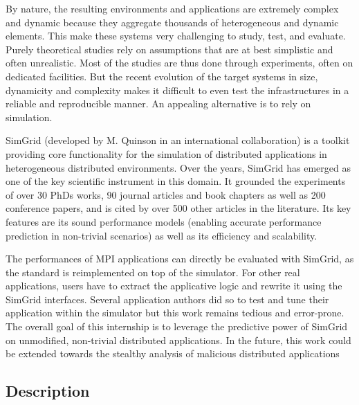 \documentclass[a4paper,11pt]{article}
\begin{document}
By nature, the resulting environments and applications are extremely
complex and dynamic because they aggregate thousands of heterogeneous
and dynamic elements. This make these systems very challenging to
study, test, and evaluate.  Purely theoretical studies rely on
assumptions that are at best simplistic and often unrealistic. Most of
the studies are thus done through experiments, often on dedicated
facilities.
%
But the recent evolution of the target systems in size, dynamicity and
complexity makes it difficult to even test the infrastructures in a
reliable and reproducible manner. An appealing alternative is to rely
on simulation.


SimGrid (developed by M. Quinson in an international collaboration) is
a toolkit providing core functionality for the simulation of
distributed applications in heterogeneous distributed environments.
Over the years, SimGrid has emerged as one of the key scientific
instrument in this domain. It grounded the experiments of over 30 PhDs
works, 90 journal articles and book chapters as well as 200 conference
papers, and is cited by over 500 other articles in the literature. Its
key features are its sound performance models (enabling accurate
performance prediction in non-trivial scenarios) as well as its
efficiency and scalability.

The performances of MPI applications can directly be evaluated with
SimGrid, as the standard is reimplemented on top of the simulator. For
other real applications, users have to extract the applicative logic
and rewrite it using the SimGrid interfaces. Several application
authors did so to test and tune their application within the simulator
but this work remains tedious and error-prone. The overall goal of
this internship is to leverage the predictive power of SimGrid on
unmodified, non-trivial distributed applications. In the future, this
work could be extended towards the stealthy analysis of malicious
distributed applications

\subsection*{Description}

\end{document}
